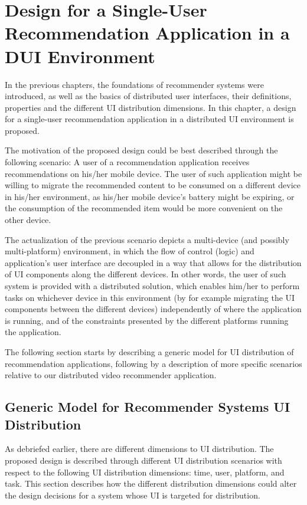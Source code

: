 \chapter{Design for a Single-User Recommendation Application in a DUI Environment}\label{chapter:design}

In the previous chapters, the foundations of recommender systems were introduced, as well as the basics of distributed user interfaces, their definitions, properties and the different UI distribution dimensions. In this chapter, a design for a single-user recommendation application in a distributed UI environment is proposed.

The motivation of the proposed design could be best described through the following scenario: A user of a recommendation application receives recommendations on his/her mobile device. The user of such application might be willing to migrate the recommended content to be consumed on a different device in his/her environment, as his/her mobile device's battery might be expiring, or the consumption of the recommended item would be more convenient on the other device.

The actualization of the previous scenario depicts a multi-device (and possibly multi-platform) environment, in which the flow of control (logic) and application's user interface are decoupled in a way that allows for the distribution of UI components along the different devices. In other words, the user of such system is provided with a distributed solution, which enables him/her to perform tasks on whichever device in this environment (by for example migrating the UI components between the different devices) independently of where the application is running, and of the constraints presented by the different platforms running the application.

The following section starts by describing a generic model for UI distribution of recommendation applications, following by a description of more specific scenarios relative to our distributed video recommender application.


\section{Generic Model for Recommender Systems UI Distribution}
As debriefed earlier, there are different dimensions to UI distribution. The proposed design is described through different UI distribution scenarios with respect to the following UI distribution dimensions: time, user, platform, and task. This section describes how the different distribution dimensions could alter the design decisions for a system whose UI is targeted for distribution. 

